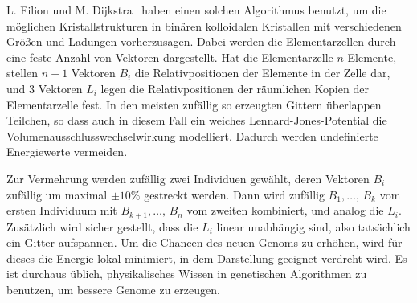 L. Filion und M. Dijkstra~\cite{filion09a} haben einen solchen
Algorithmus benutzt, um die möglichen Kristallstrukturen in binären
kolloidalen Kristallen mit verschiedenen Größen und Ladungen
vorherzusagen. Dabei werden die Elementarzellen durch eine feste
Anzahl von Vektoren dargestellt. Hat die Elementarzelle $n$ Elemente,
stellen $n-1$ Vektoren $B_i$ die Relativpositionen der Elemente in der
Zelle dar, und 3 Vektoren $L_i$ legen die Relativpositionen der
räumlichen Kopien der Elementarzelle fest. In den meisten zufällig so
erzeugten Gittern überlappen Teilchen, so dass auch in diesem Fall ein
weiches Lennard-Jones-Potential die Volumenausschlusswechselwirkung
modelliert. Dadurch werden undefinierte Energiewerte vermeiden.

Zur Vermehrung werden zufällig zwei Individuen gewählt, deren Vektoren
$B_i$ zufällig um maximal $\pm 10\%$ gestreckt werden. Dann wird
zufällig $B_1,\ldots,\,B_k$ vom ersten Individuum mit
$B_{k+1},\ldots,\,B_n$ vom zweiten kombiniert, und analog die
$L_i$. Zusätzlich wird sicher gestellt, dass die $L_i$ linear
unabhängig sind, also tatsächlich ein Gitter aufspannen. Um die
Chancen des neuen Genoms zu erhöhen, wird für dieses die Energie lokal
minimiert, in dem Darstellung geeignet verdreht wird. Es ist durchaus
üblich, physikalisches Wissen in genetischen Algorithmen zu benutzen,
um bessere Genome zu erzeugen.

